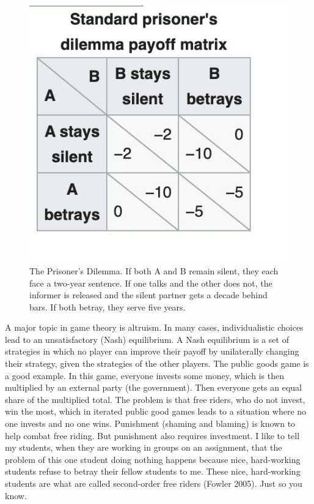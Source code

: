 \documentclass[
  a4paper,
  DIV=11,
  numbers=noendperiod,
  oneside]{scrreprt}
\begin{document}
\begin{figure}

{\centering \includegraphics{media/ch5n/image9.jpg}

}

\caption{\label{fig-ch5n-img9-old-47}The Prisoner's Dilemma. If both A
and B remain silent, they each face a two-year sentence. If one talks
and the other does not, the informer is released and the silent partner
gets a decade behind bars. If both betray, they serve five years.}

\end{figure}

A major topic in game theory is altruism. In many cases, individualistic
choices lead to an unsatisfactory (Nash) equilibrium. A Nash equilibrium
is a set of strategies in which no player can improve their payoff by
unilaterally changing their strategy, given the strategies of the other
players. The public goods game is a good example. In this game, everyone
invests some money, which is then multiplied by an external party (the
government). Then everyone gets an equal share of the multiplied total.
The problem is that free riders, who do not invest, win the most, which
in iterated public good games leads to a situation where no one invests
and no one wins. Punishment (shaming and blaming) is known to help
combat free riding. But punishment also requires investment. I like to
tell my students, when they are working in groups on an assignment, that
the problem of this one student doing nothing happens because nice,
hard-working students refuse to betray their fellow students to me.
These nice, hard-working students are what are called second-order free
riders (Fowler 2005). Just so you know.
\end{document}

